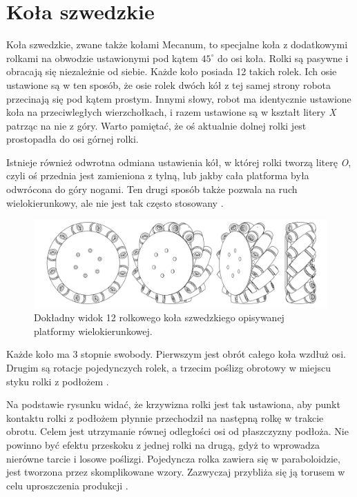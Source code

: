 \section{Koła szwedzkie}
Koła szwedzkie, zwane także kołami Mecanum, to specjalne koła z dodatkowymi rolkami na obwodzie ustawionymi pod kątem $45^\circ$ do osi koła.
Rolki są pasywne i obracają się niezależnie od siebie. Każde koło posiada 12 takich rolek.
Ich osie ustawione są w ten sposób, że osie rolek dwóch kół z tej samej strony robota przecinają się pod kątem prostym.
Innymi słowy, robot ma identycznie ustawione koła na przeciwległych wierzchołkach, i razem ustawione są w kształt litery \emph{X} patrząc na nie z góry.
Warto pamiętać, że oś aktualnie dolnej rolki jest prostopadła do osi górnej rolki.

Istnieje również odwrotna odmiana ustawienia kół, w której rolki tworzą literę \emph{O}, czyli oś przednia jest zamieniona z tylną, lub jakby cała platforma była odwrócona do góry nogami.
Ten drugi sposób także pozwala na ruch wielokierunkowy, ale nie jest tak często stosowany \cite{paletobot}.

\begin{figure}[H]
\centering
 \includegraphics[width=\textwidth]{graphics/wheel.pdf}
\caption{Dokładny widok 12 rolkowego koła szwedzkiego opisywanej platformy wielokierunkowej.}
\end{figure} 

Każde koło ma 3 stopnie swobody. Pierwszym jest obrót całego koła wzdłuż osi.
Drugim są rotacje pojedynczych rolek, a trzecim poślizg obrotowy w miejscu styku rolki z podłożem \cite{kinematic_modeling}.

Na podstawie rysunku widać, że krzywizna rolki jest tak ustawiona, aby punkt kontaktu rolki z podłożem płynnie przechodził na następną rolkę w trakcie obrotu.
Celem jest utrzymanie równej odległości osi od płaszczyzny podłoża.
Nie powinno być efektu przeskoku z jednej rolki na drugą, gdyż to wprowadza nierówne tarcie i losowe poślizgi.
Pojedyncza rolka zawiera się w paraboloidzie, jest tworzona przez skomplikowane wzory.
Zazwyczaj przybliża się ją torusem w celu uproszczenia produkcji \cite{rollers}.

